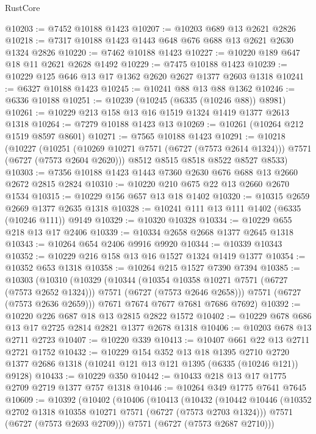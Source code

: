 \begin{lexlean}{RustCore}
\begin{coremodule}
@10203 := @7452 @10188 @1423
@10207 := @10203 @689 @13 @2621 @2826
@10218 := @7317 @10188 @1423 @1443 @648 @676 @688 @13 @2621 @2630 @1324 @2826
@10220 := @7462 @10188 @1423
@10227 := @10220 @189 @647 @18 @11 @2621 @2628 @1492
@10229 := @7475 @10188 @1423
@10239 := @10229 @125 @646 @13 @17 @1362 @2620 @2627 @1377 @2603 @1318
@10241 := @6327 @10188 @1423
@10245 := @10241 @88 @13 @88 @1362
@10246 := @6336 @10188
@10251 := @10239 (@10245 (@6335 (@10246 @88)) @8981)
@10261 := @10229 @213 @158 @13 @16 @1519 @1324 @1419 @1377 @2613 @1318
@10264 := @7279 @10188 @1423 @13
@10269 := @10261 (@10264 @212 @1519 @8597 @8601)
@10271 := @7565 @10188 @1423
@10291 := @10218
    (@10227
      (@10251 (@10269 @10271 @7571 (@6727 (@7573 @2614 @1324))) @7571 (@6727 (@7573 @2604 @2620)))
      @8512
      @8515
      @8518
      @8522
      @8527
      @8533)
@10303 := @7356 @10188 @1423 @1443 @7360 @2630 @676 @688 @13 @2660 @2672 @2815 @2824
@10310 := @10220 @210 @675 @22 @13 @2660 @2670 @1534
@10315 := @10229 @156 @657 @13 @18 @1402
@10320 := @10315 @2659 @2669 @1377 @2635 @1318
@10328 := @10241 @111 @13 @111 @1402 (@6335 (@10246 @111)) @9149
@10329 := @10320 @10328
@10334 := @10229 @655 @218 @13 @17 @2406
@10339 := @10334 @2658 @2668 @1377 @2645 @1318
@10343 := @10264 @654 @2406 @9916 @9920
@10344 := @10339 @10343
@10352 := @10229 @216 @158 @13 @16 @1527 @1324 @1419 @1377
@10354 := @10352 @653 @1318
@10358 := @10264 @215 @1527 @7390 @7394
@10385 := @10303
    (@10310
      (@10329
        (@10344
          (@10354 @10358 @10271 @7571 (@6727 (@7573 @2652 @1324)))
          @7571
          (@6727 (@7573 @2646 @2658)))
        @7571
        (@6727 (@7573 @2636 @2659)))
      @7671
      @7674
      @7677
      @7681
      @7686
      @7692)
@10392 := @10220 @226 @687 @18 @13 @2815 @2822 @1572
@10402 := @10229 @678 @686 @13 @17 @2725 @2814 @2821 @1377 @2678 @1318
@10406 := @10203 @678 @13 @2711 @2723
@10407 := @10220 @339
@10413 := @10407 @661 @22 @13 @2711 @2721 @1752
@10432 := @10229
    @154
    @352
    @13
    @18
    @1395
    @2710
    @2720
    @1377
    @2686
    @1318
    (@10241 @121 @13 @121 @1395 (@6335 (@10246 @121)) @9128)
@10433 := @10229 @350
@10442 := @10433 @218 @13 @17 @1775 @2709 @2719 @1377 @757 @1318
@10446 := @10264 @349 @1775 @7641 @7645
@10609 := @10392
    (@10402
      (@10406
        (@10413
          (@10432
            (@10442
              @10446
              (@10352 @2702 @1318 @10358 @10271 @7571 (@6727 (@7573 @2703 @1324)))
              @7571
              (@6727 (@7573 @2693 @2709)))
            @7571
            (@6727 (@7573 @2687 @2710)))

\end{coremodule}
\end{lexlean}
